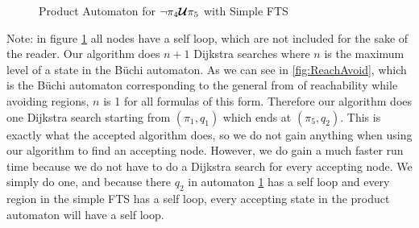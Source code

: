 \begin{figure}
\centering
{}
\caption{Product Automaton for $\neg \pi_4 \bm{\mathcal{U}} \pi_5$ with Simple FTS}
\label{fig:reachAvoidProduct}
\end{figure}
Note: in figure \ref{fig:reachAvoidProduct} all nodes have a self loop, which are not included for the sake of the reader.
Our algorithm does $n+1$ Dijkstra searches where $n$ is the maximum level of a state in the B\"{u}chi automaton. As we can see in \ref{fig:ReachAvoid}, which is the B\"{u}chi automaton corresponding to the general from of reachability while avoiding regions, $n$ is 1 for all formulas of this form. Therefore our algorithm does one Dijkstra search starting from $(\pi_1,q_1)$ which ends at $(\pi_5,q_2)$. This is exactly what the accepted algorithm does, so we do not gain anything when using our algorithm to find an accepting node. However, we do gain a much faster run time because we do not have to do a Dijkstra search for every accepting node. We simply do one, and because there $q_2$ in automaton \ref{fig:reachAvoidProduct} has a self loop and every region in the simple FTS has a self loop, every accepting state in the product automaton will have a self loop.

